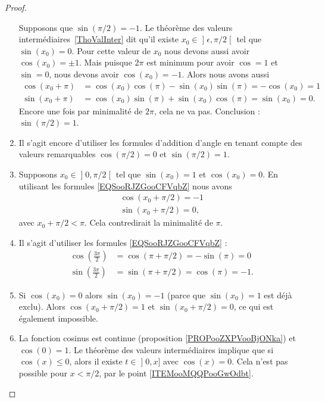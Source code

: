 \begin{proof}
\begin{enumerate}
			      Supposons que \( \sin(\pi/2)=-1\). Le théorème des valeurs intermédiaires~\ref{ThoValInter} dit qu'il existe \( x_0\in\mathopen] \epsilon , \pi/2 \mathclose[\) tel que \( \sin(x_0)=0\). Pour cette valeur de \( x_0\) nous devons aussi avoir \( \cos(x_0)=\pm 1\). Mais puisque \( 2\pi\) est minimum pour avoir \( \cos=1\) et \( \sin=0\), nous devons avoir \( \cos(x_0)=-1\). Alors nous avons aussi
		      \begin{subequations}
			      \begin{align}
				      \cos(x_0+\pi) & =\cos(x_0)\cos(\pi)-\sin(x_0)\sin(\pi)  =-\cos(x_0)   =1  \\
				      \sin(x_0+\pi) & =\cos(x_0)\sin(\pi)+\sin(x_0)\cos(\pi)  = \sin(x_0)   =0.
			      \end{align}
		      \end{subequations}
		      Encore une fois par minimalité de \( 2\pi\), cela ne va pas. Conclusion : \( \sin(\pi/2)=1\).
		\item
		      Il s'agit encore d'utiliser les formules d'addition d'angle en tenant compte des valeurs remarquables \( \cos(\pi/2)=0\) et \( \sin(\pi/2)=1\).
		\item
		      Supposons \( x_0\in\mathopen] 0 , \pi/2 \mathclose[\) tel que \( \sin(x_0)=1\) et \( \cos(x_0)=0\). En utilisant les formules \eqref{EQSooRJZGooCFVqbZ} nous avons
		      \begin{subequations}
			      \begin{align}
				      \cos(x_0+\pi/2)=-1 \\
				      \sin(x_0+\pi/2)=0,
			      \end{align}
		      \end{subequations}
		      avec \( x_0+\pi/2<\pi\). Cela contredirait la minimalité de \( \pi\).
		\item
		      Il s'agit d'utiliser les formules \eqref{EQSooRJZGooCFVqbZ} :
		      \begin{subequations}
			      \begin{align}
				      \cos(\frac{ 3\pi }{ 2 }) & =\cos(\pi+\pi/2)   =-\sin(\pi) =0   \\
				      \sin(\frac{ 3\pi }{ 2 }) & =\sin(\pi+\pi/2)   = \cos(\pi) =-1.
			      \end{align}
		      \end{subequations}
		\item
		      Si \( \cos(x_0)=0\) alors \( \sin(x_0)=-1\) (parce que \( \sin(x_0)=1\) est déjà exclu). Alors \( \cos(x_0+\pi/2)=1\) et \( \sin(x_0+\pi/2)=0\), ce qui est également impossible.
		\item
		      La fonction cosinus est continue (proposition \ref{PROPooZXPVooBjONka}) et \( \cos(0)=1\). Le théorème des valeurs intermédiaires implique que si \( \cos(x)\leq 0\), alors il existe \( t\in \mathopen] 0 , x \mathclose]\) avec \( \cos(x)=0\). Cela n'est pas possible pour \( x<\pi/2\), par le point \ref{ITEMooMQQPooGwOdbt}.


\end{enumerate}
\end{proof}
